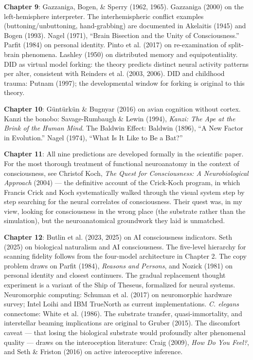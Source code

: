 \documentclass[11pt, twoside, openright]{book}
\begin{document}
\textbf{Chapter 9}: Gazzaniga, Bogen, \& Sperry (1962, 1965). Gazzaniga (2000) on the left-hemisphere interpreter. The interhemispheric conflict examples (buttoning/unbuttoning, hand-grabbing) are documented in Akelaitis (1945) and Bogen (1993). Nagel (1971), ``Brain Bisection and the Unity of Consciousness.'' Parfit (1984) on personal identity. Pinto et al. (2017) on re-examination of split-brain phenomena. Lashley (1950) on distributed memory and equipotentiality. DID as virtual model forking: the theory predicts distinct neural activity patterns per alter, consistent with Reinders et al. (2003, 2006). DID and childhood trauma: Putnam (1997); the developmental window for forking is original to this theory.

\textbf{Chapter 10}: Güntürkün \& Bugnyar (2016) on avian cognition without cortex. Kanzi the bonobo: Savage-Rumbaugh \& Lewin (1994), \textit{Kanzi: The Ape at the Brink of the Human Mind}. The Baldwin Effect: Baldwin (1896), ``A New Factor in Evolution.'' Nagel (1974), ``What Is It Like to Be a Bat?''

\textbf{Chapter 11}: All nine predictions are developed formally in the scientific paper. For the most thorough treatment of functional neuroanatomy in the context of consciousness, see Christof Koch, \textit{The Quest for Consciousness: A Neurobiological Approach} (2004) --- the definitive account of the Crick-Koch program, in which Francis Crick and Koch systematically walked through the visual system step by step searching for the neural correlates of consciousness. Their quest was, in my view, looking for consciousness in the wrong place (the substrate rather than the simulation), but the neuroanatomical groundwork they laid is unmatched.

\textbf{Chapter 12}: Butlin et al. (2023, 2025) on AI consciousness indicators. Seth (2025) on biological naturalism and AI consciousness. The five-level hierarchy for scanning fidelity follows from the four-model architecture in Chapter 2. The copy problem draws on Parfit (1984), \textit{Reasons and Persons}, and Nozick (1981) on personal identity and closest continuers. The gradual replacement thought experiment is a variant of the Ship of Theseus, formalized for neural systems. Neuromorphic computing: Schuman et al. (2017) on neuromorphic hardware survey; Intel Loihi and IBM TrueNorth as current implementations. \textit{C. elegans} connectome: White et al. (1986). The substrate transfer, quasi-immortality, and interstellar beaming implications are original to Gruber (2015). The discomfort caveat --- that losing the biological substrate would profoundly alter phenomenal quality --- draws on the interoception literature: Craig (2009), \textit{How Do You Feel?}, and Seth \& Friston (2016) on active interoceptive inference.
\end{document}
